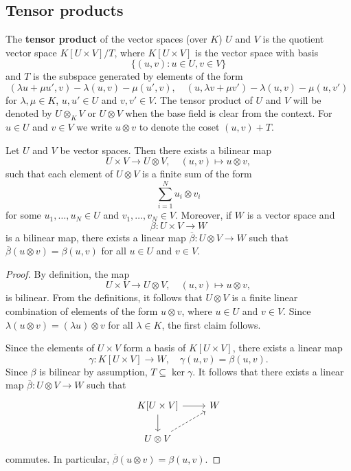 \section{}
\label{11}

\subsection{Tensor products}

The \textbf{tensor product} of the vector spaces (over $K$) $U$ and $V$ 
is the quotient vector space $K[U\times V]/T$, where $K[U\times V]$ 
is the vector space with basis 
\[
\{(u,v):u\in U,v\in V\}
\]
and $T$ is the subspace 
generated by elements of the form 
\[
		(\lambda u+\mu u',v)-\lambda(u,v)-\mu(u',v),\quad
		(u,\lambda v+\mu v')-\lambda(u,v)-\mu(u,v')
	\]
for $\lambda,\mu\in K$, $u,u'\in U$ and $v,v'\in V$.
The tensor product of $U$ and $V$ will be denoted by $U\otimes_KV$ or 
$U\otimes V$ when the base field is clear from the context. For $u\in U$ and 
$v\in V$ we write $u\otimes v$ to denote the coset $(u,v)+T$.

\begin{theorem}
	Let $U$ and $V$ be vector spaces. Then there exists a bilinear map 
	\[
    U\times V\to U\otimes V,\quad (u,v)\mapsto u\otimes v,
    \]
    such that 
	each element of $U\otimes V$ is a finite sum of the form 
	\[
		\sum_{i=1}^N u_i\otimes v_i
	\]
	for some $u_1,\dots,u_N\in U$ and $v_1,\dots,v_N\in V$. 
	Moreover, if $W$ is a vector space and 
 \[
 \beta\colon U\times V\to W
 \]
 is a bilinear map, 
	there exists a linear map 
	$\overline{\beta}\colon U\otimes V\to W$ such that $\overline{\beta}(u\otimes
	v)=\beta(u,v)$ for all $u\in U$ and $v\in V$.
\end{theorem}

\begin{proof}
    By definition, the map
    \[
	U\times V\to U\otimes V,\quad
	(u,v)\mapsto u\otimes v,
	\]
	is bilinear. From the definitions, it follows that
	$U\otimes V$ is a finite linear combination of elements of the form 
	$u\otimes v$, where $u\in U$ and $v\in V$. Since $\lambda(u\otimes
	v)=(\lambda u)\otimes v$ for all $\lambda\in K$, the first claim follows.

	Since the elements of $U\times V$ form a basis of $K[U\times V]$, there exists
	a linear map 
	\[
		\gamma\colon K[U\times V]\to W,\quad
	\gamma(u,v)=\beta(u,v). 
	\]
	Since $\beta$ is bilinear by assumption, $T\subseteq\ker\gamma$. It follows that there exists 
	a linear map $\overline{\beta}\colon U\otimes V\to
	W$ such that  
	\[
	\begin{tikzcd}
		K[U\times V] \arrow[r]\arrow[d] & W \\
		U\otimes V\arrow[ur, dashrightarrow]
	\end{tikzcd}
	\]
	commutes. In particular, $\overline{\beta}(u\otimes v)=\beta(u,v)$. 
\end{proof}

